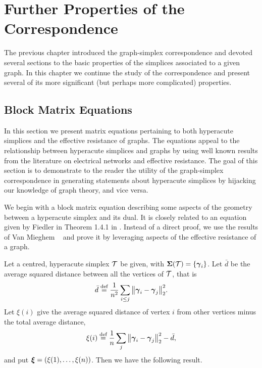 \chapter{Further Properties of the Correspondence}
\label{chap:further_properties}


The previous chapter introduced the graph-simplex correspondence and devoted several sections to the basic properties of the simplices associated to a given graph. In this chapter we  continue the study of the correspondence and present several of its more significant (but perhaps more complicated) properties.  



\section{Block Matrix Equations}
\label{sec:block_matrix}
In this section we present matrix equations pertaining to both hyperacute simplices and the effective resistance of graphs. The equations appeal to the relationship between hyperacute simplices and graphs by using well known results from the literature on electrical networks and effective resistance. The goal of this section is to demonstrate to the reader the utility of the graph-simplex correspondence in generating statements about hyperacute simplices by hijacking our knowledge of graph theory,  and vice versa. 

We begin with a block matrix equation describing some aspects of  the geometry between a  hyperacute simplex and its dual. It is closely related to an equation given by Fiedler in Theorem 1.4.1 in \cite{fiedler2011matrices}. Instead  of a direct proof, we use the results of Van Mieghem \etal~\cite{van2017pseudoinverse} and prove it by leveraging aspects of the effective resistance of a graph.  

Let a centred, hyperacute simplex $\mathcal{T}$ be given, with $\boldsymbol{\Sigma}(\mathcal{T})=\{\vb*{\gamma}_i\}$.  Let $\bar{d}$ be the average squared distance between all the vertices of $\mathcal{T}$, that is
\begin{equation}
\label{eq:avg_squared_distance}
\bar{d} \overset{\text{def}}{=}  \frac{1}{n^2}\sum_{i\leq j} \norm{\vb*{\gamma}_i-\vb*{\gamma}_j}_2^2.
\end{equation}
Let $\xi(i)$ give the average squared distance of vertex $i$ from other vertices minus the total average distance, 
\begin{equation}
\label{eq:avg_sqd_distance_i}
\xi(i) \overset{\text{def}}{=} \frac{1}{n}\sum_{j} \norm{\vb*{\gamma}_i-\vb*{\gamma}_j}_2^2 - \bar{d},
\end{equation}
and put $\vb*{\xi}=(\xi(1),\dots,\xi(n))$. 
Then we have the following result. 

